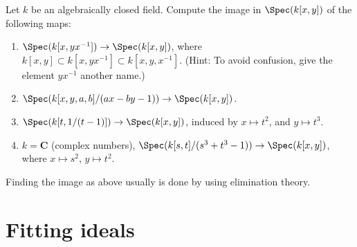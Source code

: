\begin{exercise}
\label{exercise-images}
Let $k$ be an algebraically closed field. Compute the image in
$\Spec(k[x, y])$
of the following maps:
\begin{enumerate}
\item $\Spec(k[x, yx^{-1}]) \to \Spec(k[x, y])$, where
$k[x, y] \subset k[x, yx^{-1}] \subset k[x, y, x^{-1}]$.
(Hint: To avoid confusion, give the element $yx^{-1}$ another name.)
\item $\Spec(k[x, y, a, b]/(ax-by-1))\to \Spec(k[x, y])$.
\item $\Spec(k[t, 1/(t-1)]) \to \Spec(k[x, y])$, induced by $x
\mapsto t^2$,
and $y \mapsto t^3$.
\item $k = {\mathbf C}$ (complex numbers),
$\Spec(k[s, t]/(s^3 + t^3-1)) \to \Spec(k[x, y])$, where
$x\mapsto s^2$, $y \mapsto t^2$.
\end{enumerate}
\end{exercise}

\begin{remark}
\label{remark-elimination-theory}
Finding the image as above usually is done by using elimination theory.
\end{remark}




\section{Fitting ideals}
\label{section-fitting-ideals}

